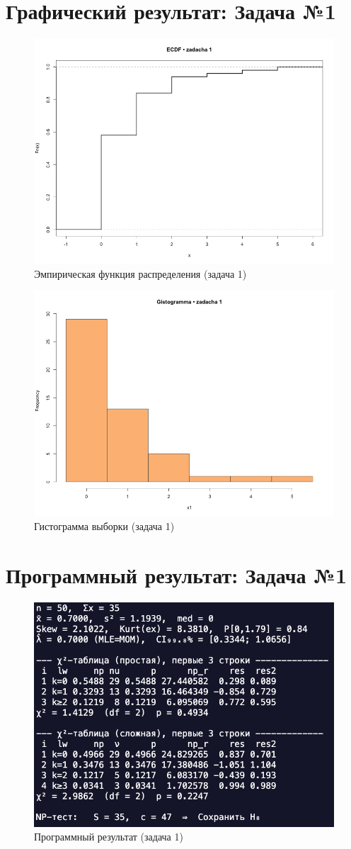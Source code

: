 \documentclass[areasetadvanced]{scrartcl}
\begin{document}
\section{Графический результат: Задача №1}
\begin{figure}[H]\centering
\includegraphics[width=.72\linewidth]{fig/emp_dist_1.png}
\caption{Эмпирическая функция распределения (задача 1)}
\label{fig:ecdf1}
\end{figure}

\begin{figure}[H]\centering
\includegraphics[width=.72\linewidth]{fig/hist_1.png}
\caption{Гистограмма выборки (задача 1)}
\label{fig:hist1}
\end{figure}

\newpage
\section{Программный результат: Задача №1}
\begin{figure}[H]\centering
  \includegraphics[width=0.5\linewidth]{Final.png}
  \caption{Программный результат (задача 1)}
\end{figure}
\newpage
\end{document}
